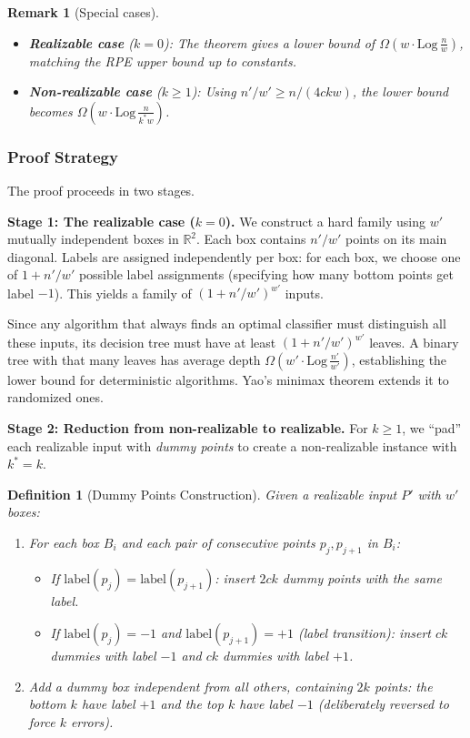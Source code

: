 \documentclass[11pt, a4paper]{article}
\theoremstyle{boxed}
\newtheorem{innerdefinition}{Definition}[section]
\newtheorem{innerremark}{Remark}[section]
\newenvironment{definition}
  {\begin{mdframed}[style=defstyle]\begin{innerdefinition}}
  {\end{innerdefinition}\end{mdframed}}
\newenvironment{remark}
  {\begin{mdframed}[style=notestyle]\begin{innerremark}}
  {\end{innerremark}\end{mdframed}}
\newcommand{\R}{\mathbb{R}}
\newcommand{\kstar}{k^{*}}
\begin{document}
\begin{remark}[Special cases]
  \leavevmode
  \begin{itemize}
    \item \textbf{Realizable case} ($k = 0$): The theorem gives a lower bound of $\Omega(w \cdot \mathrm{Log}\,\frac{n}{w})$, matching the RPE upper bound up to constants.
    \item \textbf{Non-realizable case} ($k \ge 1$): Using $n'/w' \ge n/(4ckw)$, the lower bound becomes $\Omega(w \cdot \mathrm{Log}\,\frac{n}{\kstar w})$.
  \end{itemize}
\end{remark}

\subsubsection{Proof Strategy}

The proof proceeds in two stages.

\medskip
\noindent\textbf{Stage 1: The realizable case ($k = 0$).} We construct a hard family using $w'$ mutually independent boxes in $\R^2$. Each box contains $n'/w'$ points on its main diagonal. Labels are assigned independently per box: for each box, we choose one of $1 + n'/w'$ possible label assignments (specifying how many bottom points get label $-1$). This yields a family of $(1 + n'/w')^{w'}$ inputs.

Since any algorithm that always finds an optimal classifier must distinguish all these inputs, its decision tree must have at least $(1 + n'/w')^{w'}$ leaves. A binary tree with that many leaves has average depth $\Omega(w' \cdot \mathrm{Log}\,\frac{n'}{w'})$, establishing the lower bound for deterministic algorithms. Yao's minimax theorem extends it to randomized ones.

\medskip
\noindent\textbf{Stage 2: Reduction from non-realizable to realizable.} For $k \ge 1$, we ``pad'' each realizable input with \emph{dummy points} to create a non-realizable instance with $\kstar = k$.

\begin{definition}[Dummy Points Construction]
  Given a realizable input $P'$ with $w'$ boxes:
  \begin{enumerate}
    \item For each box $B_i$ and each pair of consecutive points $p_j, p_{j+1}$ in $B_i$:
    \begin{itemize}
      \item If $\mathrm{label}(p_j) = \mathrm{label}(p_{j+1})$: insert $2ck$ dummy points with the same label.
      \item If $\mathrm{label}(p_j) = -1$ and $\mathrm{label}(p_{j+1}) = +1$ (label transition): insert $ck$ dummies with label $-1$ and $ck$ dummies with label $+1$.
    \end{itemize}
    \item Add a \emph{dummy box} independent from all others, containing $2k$ points: the bottom $k$ have label $+1$ and the top $k$ have label $-1$ (deliberately reversed to force $k$ errors).
  \end{enumerate}
\end{definition}
\end{document}
